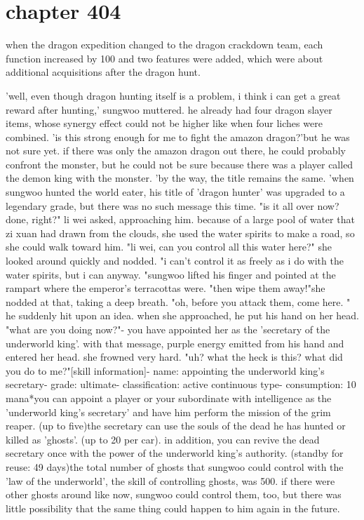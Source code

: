 \section{chapter 404}

when the dragon expedition changed to the dragon crackdown team, each function increased by 100%
 and two features were added, which were about additional acquisitions after the dragon hunt.





'well, even though dragon hunting itself is a problem, i think i can get a great reward after hunting,' sungwoo muttered.
he already had four dragon slayer items, whose synergy effect could not be higher like when four liches were combined.
'is this strong enough for me to fight the amazon dragon?'but he was not sure yet.
 if there was only the amazon dragon out there, he could probably confront the monster, but he could not be sure because there was a player called the demon king with the monster.
'by the way, the title remains the same.
'when sungwoo hunted the world eater, his title of 'dragon hunter' was upgraded to a legendary grade, but there was no such message this time.
"is it all over now? done, right?" li wei asked, approaching him.
because of a large pool of water that zi xuan had drawn from the clouds, she used the water spirits to make a road, so she could walk toward him.
"li wei, can you control all this water here?" she looked around quickly and nodded.
"i can't control it as freely as i do with the water spirits, but i can anyway.
"sungwoo lifted his finger and pointed at the rampart where the emperor's terracottas were.
"then wipe them away!"she nodded at that, taking a deep breath.
"oh, before you attack them, come here.
"
he suddenly hit upon an idea.
 when she approached, he put his hand on her head.
"what are you doing now?"- you have appointed her as the 'secretary of the underworld king'.
with that message, purple energy emitted from his hand and entered her head.
she frowned very hard.
"uh? what the heck is this? what did you do to me?"[skill information]- name: appointing the underworld king's secretary- grade: ultimate- classification: active continuous type- consumption: 10 mana*you can appoint a player or your subordinate with intelligence as the 'underworld king's secretary' and have him perform the mission of the grim reaper.
 (up to five)the secretary can use the souls of the dead he has hunted or killed as 'ghosts'.
 (up to 20 per car).
 in addition, you can revive the dead secretary once with the power of the underworld king's authority.
 (standby for reuse: 49 days)the total number of ghosts that sungwoo could control with the 'law of the underworld', the skill of controlling ghosts, was 500.
if there were other ghosts around like now, sungwoo could control them, too, but there was little possibility that the same thing could happen to him again in the future.

